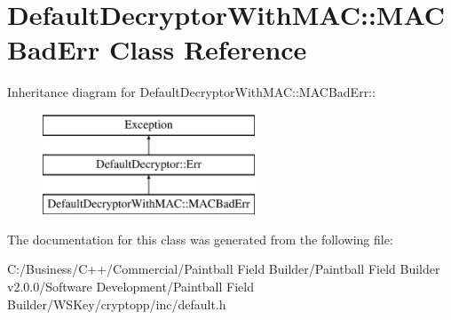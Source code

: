 \hypertarget{class_default_decryptor_with_m_a_c_1_1_m_a_c_bad_err}{
\section{DefaultDecryptorWithMAC::MACBadErr Class Reference}
\label{class_default_decryptor_with_m_a_c_1_1_m_a_c_bad_err}
}
Inheritance diagram for DefaultDecryptorWithMAC::MACBadErr::\begin{figure}[H]
\begin{center}
\leavevmode
\includegraphics[height=3cm]{class_default_decryptor_with_m_a_c_1_1_m_a_c_bad_err}
\end{center}
\end{figure}


The documentation for this class was generated from the following file:\begin{DoxyCompactItemize}
\item 
C:/Business/C++/Commercial/Paintball Field Builder/Paintball Field Builder v2.0.0/Software Development/Paintball Field Builder/WSKey/cryptopp/inc/default.h\end{DoxyCompactItemize}

